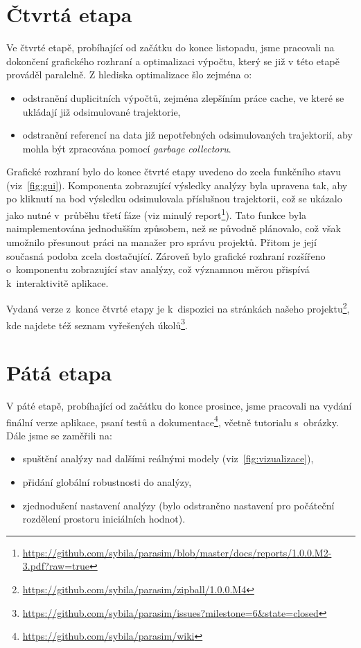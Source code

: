 \documentclass{parasim}
\begin{document}
\section{Čtvrtá etapa}

Ve čtvrté etapě, probíhající od začátku do konce listopadu, jsme pracovali na dokončení grafického rozhraní a
optimalizaci výpočtu, který se již v této etapě prováděl paralelně. Z hlediska optimalizace šlo zejména o:

\begin{itemize}
	\item	odstranění duplicitních výpočtů, zejména zlepšíním práce cache, ve které se ukládají již odsimulované trajektorie,
	\item	odstranění referencí na data již nepotřebných odsimulovaných trajektorií, aby mohla být zpracována pomocí \textit{garbage collectoru}.
\end{itemize}

Grafické rozhraní bylo do konce čtvrté etapy uvedeno do zcela funkčního stavu (viz \figurename\,\ref{fig:gui}). Komponenta zobrazující výsledky analýzy
byla upravena tak, aby po kliknutí na bod výsledku odsimulovala příslušnou trajektorii, což se ukázalo jako nutné v~průběhu třetí fáze (viz minulý report\footnote{
\url{https://github.com/sybila/parasim/blob/master/docs/reports/1.0.0.M2-3.pdf?raw=true}}). Tato funkce byla naimplementována jednodušším způsobem, než se původně plánovalo,
což však umožnilo přesunout práci na manažer pro správu projektů. Přitom je její současná podoba zcela dostačující. Zároveň bylo grafické rozhraní rozšířeno o~komponentu
zobrazující stav analýzy, což významnou měrou přispívá k~interaktivitě aplikace.

Vydaná verze z~konce čtvrté etapy je k~dispozici na stránkách našeho projektu\footnote{\url{https://github.com/sybila/parasim/zipball/1.0.0.M4}},
kde najdete též seznam vyřešených úkolů\footnote{\url{https://github.com/sybila/parasim/issues?milestone=6&state=closed}}.

\section{Pátá etapa}

V páté etapě, probíhající od začátku do konce prosince, jsme pracovali na vydání finální verze aplikace, psaní testů a dokumentace\footnote{\url{https://github.com/sybila/parasim/wiki}},
včetně tutorialu s~obrázky. Dále jsme se zaměřili na: 

\begin{itemize}
	\item	spuštění analýzy nad dalšími reálnými modely (viz \figurename\,\ref{fig:vizualizace}),
	\item	přidání globální robustnosti do analýzy,
	\item	zjednodušení nastavení analýzy (bylo odstraněno nastavení pro počáteční rozdělení prostoru iniciálních hodnot).
\end{itemize}
\end{document}
